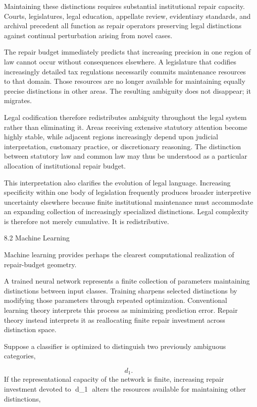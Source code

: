 \documentclass[12pt,oneside]{article}
\theoremstyle{plain}
\theoremstyle{definition}
\theoremstyle{remark}
\begin{document}
Maintaining these distinctions requires substantial institutional repair capacity. Courts, legislatures, legal education, appellate review, evidentiary standards, and archival precedent all function as repair operators preserving legal distinctions against continual perturbation arising from novel cases.

The repair budget immediately predicts that increasing precision in one region of law cannot occur without consequences elsewhere. A legislature that codifies increasingly detailed tax regulations necessarily commits maintenance resources to that domain. Those resources are no longer available for maintaining equally precise distinctions in other areas. The resulting ambiguity does not disappear; it migrates.

Legal codification therefore redistributes ambiguity throughout the legal system rather than eliminating it. Areas receiving extensive statutory attention become highly stable, while adjacent regions increasingly depend upon judicial interpretation, customary practice, or discretionary reasoning. The distinction between statutory law and common law may thus be understood as a particular allocation of institutional repair budget.

This interpretation also clarifies the evolution of legal language. Increasing specificity within one body of legislation frequently produces broader interpretive uncertainty elsewhere because finite institutional maintenance must accommodate an expanding collection of increasingly specialized distinctions. Legal complexity is therefore not merely cumulative. It is redistributive.

8.2 Machine Learning

Machine learning provides perhaps the clearest computational realization of repair-budget geometry.

A trained neural network represents a finite collection of parameters maintaining distinctions between input classes. Training sharpens selected distinctions by modifying those parameters through repeated optimization. Conventional learning theory interprets this process as minimizing prediction error. Repair theory instead interprets it as reallocating finite repair investment across distinction space.

Suppose a classifier is optimized to distinguish two previously ambiguous categories,

\[
d_1.
\]
If the representational capacity of the network is finite, increasing repair investment devoted to d_1 alters the resources available for maintaining other distinctions,
\end{document}
